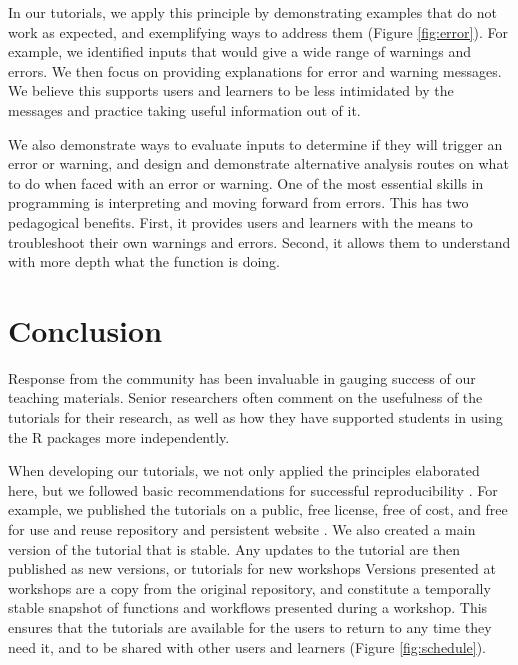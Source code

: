 \documentclass[12pt]{article}
\begin{document}
In our tutorials, we apply this principle by demonstrating examples that do not work
as expected, and exemplifying ways to address them (Figure \ref{fig:error}).
For example, we identified inputs that would give
a wide range of warnings and errors. We then focus on providing explanations for
error and warning messages. We believe this supports users and learners to be less
intimidated by the messages and practice taking useful information out of it.

We also demonstrate ways to evaluate inputs to determine if they will trigger an
error or warning, and design and demonstrate alternative analysis routes on what
to do when faced with an error or warning.
One of the most essential skills in programming is interpreting and moving forward
from errors.
This has two pedagogical benefits. First, it provides users and learners with the
means to troubleshoot their own warnings and errors. Second, it allows them to
understand with more depth what the function is doing.








\section*{Conclusion}
\label{sec:conclusion}

Response from the community has been invaluable in gauging success of our teaching
materials.
Senior researchers often comment on the usefulness
of the tutorials for their research, as well as how they have supported students in using the
R packages more independently.

When developing our tutorials, we not only applied the principles elaborated here,
but we followed basic recommendations for successful reproducibility \citep{sandve2013ten}.
For example, we published the tutorials on a public, free license, free of cost, and free for
use and reuse repository and persistent website \citep{RopentreeTutorials}.
We also created a main version of the tutorial that is stable. Any updates to the tutorial are
then published as new versions, or tutorials for new workshops \citep{wilson2006swc, SWCwebsite}
Versions presented at workshops are a copy from the original repository, and
constitute a temporally stable snapshot of functions and workflows presented
during a workshop.
This ensures that the tutorials are available for the users to return to any time
they need it, and to be shared with other users and learners (Figure \ref{fig:schedule}).
\end{document}
